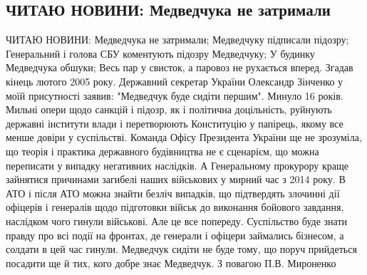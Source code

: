  
 
 
 
 
\subsection{ЧИТАЮ НОВИНИ: Медведчука не затримали}
\label{sec:12_05_2021.fb.mironenko_petr.2.medvedchuk}

ЧИТАЮ НОВИНИ:
Медведчука не затримали;
Медведчуку підписали підозру;
Генеральний і голова СБУ коментують підозру Медведчуку;
У будинку Медведчука обшуки;
Весь пар у свисток, а паровоз не рухається вперед.
Згадав кінець лютого 2005 року.
Державний секретар України Олександр Зінченко у моїй присутності заявив: "Медведчук буде сидіти першим".
Минуло 16 років.
Мильні опери щодо санкцій і підозр, як і політична доцільність, руйнують державні інститути влади і перетворюють Конституцію у папірець, якому все менше довіри у суспільстві.
Команда Офісу Президента України ще не зрозуміла, що теорія і практика державного будівництва не є сценарієм, що можна переписати у випадку негативних наслідків.
А Генеральному прокурору краще зайнятися причинами загибелі наших військових у мирний час з 2014 року. В АТО і після АТО можна знайти безліч випадків, що підтвердять злочинні дії офіцерів і генералів щодо підготовки військ до виконання бойового завдання, наслідком чого гинули військові. 
Але це все попереду. Суспільство буде знати правду про всі події на фронтах, де генерали і офіцери займались бізнесом, а солдати в цей час гинули.
Медведчук сидіти не буде тому, що поруч прийдеться посадити ще й тих, кого добре знає Медведчук.
З повагою П.В. Мироненко
